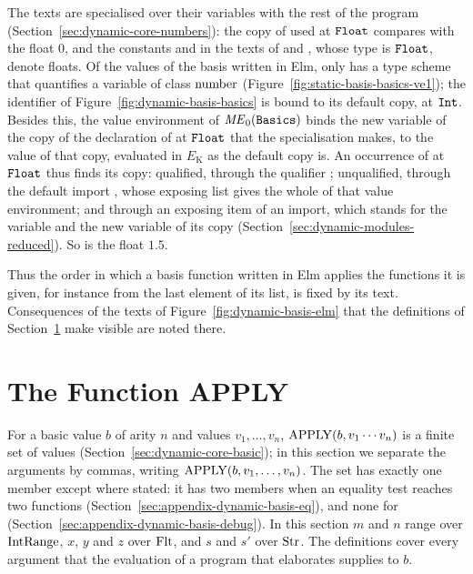 The texts are specialised over their  variables with the rest of
the program (Section~\ref{sec:dynamic-core-numbers}): the copy of  used
at $\mathtt{Float}$ compares with the float $0$, and the constants  and
 in the texts of  and , whose type is $\mathtt{Float}$,
denote floats. %
Of the values of the basis written in Elm, only  has a type scheme
that quantifies a variable of class $\mathrm{number}$
(Figure~\ref{fig:static-basis-basics-ve1}); the identifier  of
Figure~\ref{fig:dynamic-basis-basics} is bound to its default copy, at
$\mathtt{Int}$. Besides this, the value environment of $\mathit{ME}_0(\textnormal{\texttt{Basics}})$ binds
the new variable of the copy of the declaration of  at $\mathtt{Float}$
that the specialisation makes, to the value of that copy, evaluated in
$E_{\mathrm{K}}$ as the default copy is. An occurrence of  at
$\mathtt{Float}$ thus finds its copy: qualified, through the qualifier
; unqualified, through the default import
, whose exposing list gives the whole of
that value environment; and through an exposing item  of an
import, which stands for the variable and the new variable of its copy
(Section~\ref{sec:dynamic-modules-reduced}).
So  is the float $1.5$. %

Thus the order in which a basis function written in Elm applies the functions
it is given, for instance  from the last element of its list,
is fixed by its text. %
Consequences of the texts of Figure~\ref{fig:dynamic-basis-elm} that the
definitions of Section~\ref{sec:appendix-dynamic-basis-apply} make visible
are noted there. %

\section{The Function APPLY}\label{sec:appendix-dynamic-basis-apply}

For a basic value $b$ of arity $n$ and values $v_1,\ldots,v_n$,
$\mathrm{APPLY}(b,v_1\cdots v_n)$ is a finite set of values
(Section~\ref{sec:dynamic-core-basic}); in this section we separate the
arguments by commas, writing $\mathrm{APPLY}(b,v_1,\ldots,v_n)$. The set has exactly
one member except where stated: it has two members when an equality test
reaches two functions (Section~\ref{sec:appendix-dynamic-basis-eq}), and none
for  (Section~\ref{sec:appendix-dynamic-basis-debug}).
In this section $m$ and $n$ range over $\mathrm{IntRange}$, $x$, $y$ and $z$ over
$\mathrm{Flt}$, and $s$ and $s'$ over $\mathrm{Str}$.
The definitions cover every argument that the evaluation of a program that
elaborates supplies to $b$.

